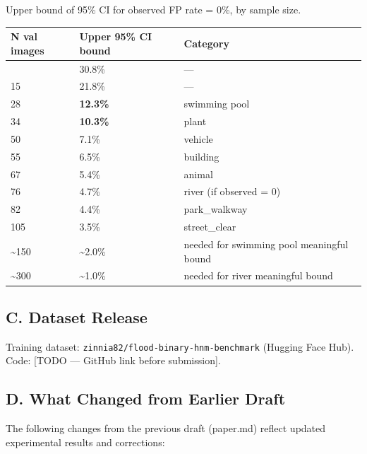 \documentclass[
  11pt,
]{article}
\newcounter{none} %
\begin{document}
Upper bound of 95\% CI for observed FP rate = 0\%, by sample size.

{\def\LTcaptype{none} %
\begin{longtable}[]{@{}lll@{}}
\toprule\noalign{}
N val images & Upper 95\% CI bound & Category \\
\midrule\noalign{}
\endhead
\bottomrule\noalign{}
\endlastfoot
10 & 30.8\% & --- \\
15 & 21.8\% & --- \\
28 & \textbf{12.3\%} & swimming pool \\
34 & \textbf{10.3\%} & plant \\
50 & 7.1\% & vehicle \\
55 & 6.5\% & building \\
67 & 5.4\% & animal \\
76 & 4.7\% & river (if observed = 0) \\
82 & 4.4\% & park\_walkway \\
105 & 3.5\% & street\_clear \\
\textasciitilde150 & \textasciitilde2.0\% & needed for swimming pool
meaningful bound \\
\textasciitilde300 & \textasciitilde1.0\% & needed for river meaningful
bound \\
\end{longtable}
}

\subsection{C. Dataset Release}\label{c.-dataset-release}

Training dataset: \texttt{zinnia82/flood-binary-hnm-benchmark} (Hugging
Face Hub). Code: {[}TODO --- GitHub link before submission{]}.

\subsection{D. What Changed from Earlier
Draft}\label{d.-what-changed-from-earlier-draft}

The following changes from the previous draft (paper.md) reflect updated
experimental results and corrections:
\end{document}
